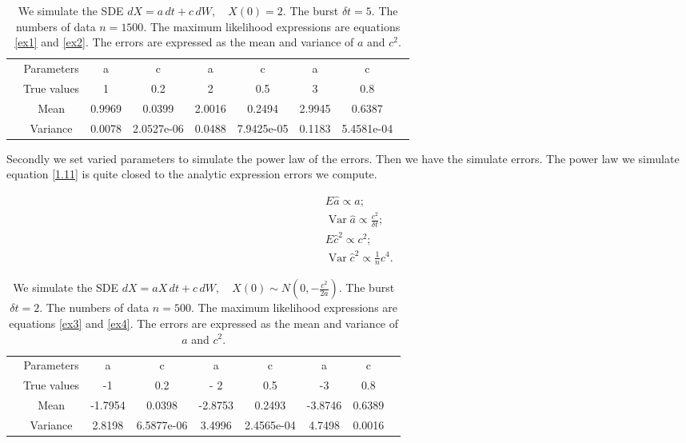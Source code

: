 \documentclass[12pt,reqno, a4paper]{article}
\numberwithin{equation}{section}
\begin{document}
\begin{table}[htbp]
  \caption{\label{tab1} We simulate the \textsc{SDE}
$
dX=a\, dt+c\, dW,   \quad  X(0)=2.
$  The burst  $\delta t=5$. The numbers of data $n=1500$. The maximum likelihood expressions are equations \eqref{ex1} and \eqref{ex2}. The errors are expressed as the mean  and variance of  $a$ and $c^2$. }
 \begin{tabular}{ccccccccc}
  \toprule
  &Parameters & a & c &  a & c& a & c\\
  &  True values  &1 & 0.2 & 2 & 0.5&3 &0.8 \\
  \midrule
&Mean& 0.9969 &0.0399& 2.0016&0.2494& 2.9945& 0.6387 \\
& Variance &0.0078&2.0527e-06 &  0.0488 &  7.9425e-05&0.1183&5.4581e-04 \\
  \bottomrule
 \end{tabular}

\end{table}


Secondly we set varied parameters to simulate the power law of the errors. Then we have the simulate errors. The power law we simulate equation \eqref{1.11} is quite closed to the analytic expression errors we compute.

\begin{eqnarray*}&&E\hat{a}\propto a; \\ &&\operatorname{Var} \hat{a}\propto \frac { c^2}{\delta t};\\
&&E\hat{c}^2\propto
 c^2 ; \\
&&\operatorname{Var} \hat{c}^2\propto \frac {1}{n} c^4.
\end{eqnarray*}


\begin{table}[htbp]
  \caption{\label{tab1} We simulate the \textsc{SDE}
$
dX=aX\, dt+c\, dW,   \quad  X(0)\sim N(0, -\frac {c^2}{2a} ).
$  The burst  $\delta t=2$. The numbers of data $n=500$. The maximum likelihood expressions are equations \eqref{ex3} and \eqref{ex4}. The errors are expressed as the mean  and variance of  $a$ and $c^2$. }
 \begin{tabular}{ccccccccc}
  \toprule
  &Parameters & a & c &  a & c& a & c\\
  &  True values  &-1 & 0.2 &- 2 & 0.5&-3 &0.8 \\
  \midrule
&Mean&  -1.7954 & 0.0398& -2.8753&0.2493& -3.8746&0.6389 \\
& Variance &2.8198&6.5877e-06 & 3.4996 &  2.4565e-04 & 4.7498& 0.0016 \\
  \bottomrule
 \end{tabular}

\end{table}
\end{document}
